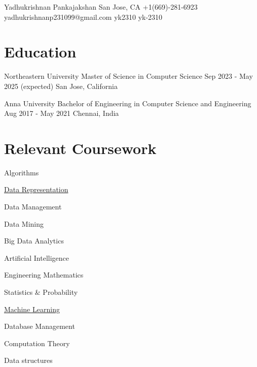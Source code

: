 \documentclass[letterpaper]{resume_config}
\begin{document}
\Header
    {Yadhukrishnan Pankajakshan} %
    {San Jose, CA} %
    {+1(669)-281-6923} %
    {yadhukrishnanp231099@gmail.com} %
    {yk2310} %
    {yk-2310} %
\vspace{-5pt}


\section{Education}

\EducationExperience
    {Northeastern University} %
    {Master of Science in Computer Science} %
    {Sep 2023 - May 2025 \footnotesize{(expected)}} %
    {San Jose, California} %

\EducationExperience
    {Anna University} %
    {Bachelor of Engineering in Computer Science and Engineering} %
    {Aug 2017 - May 2021} %
    {Chennai, India} %
\vspace{-15pt}



\section{Relevant Coursework}
\vspace{-5pt}
\begin{SkillsList}{
    \item{Algorithms}
    \item{\href{https://coursera.org/share/60e08a9390dc0ed469da34213f7a9d9c}{Data Representation}}
    \item{Data Management}
    \item{Data Mining}
    \item{Big Data Analytics}
    \item{Artificial Intelligence}
    \item{Engineering Mathematics}
    \item{Statistics \& Probability}
    \item{\href{https://coursera.org/share/b76edb1c16934e4a06f3553c2c4e67b8}{Machine Learning}}
    \item{Database Management}
    \item{Computation Theory}
    \item{Data structures}
}
\end{SkillsList}
\end{document}
